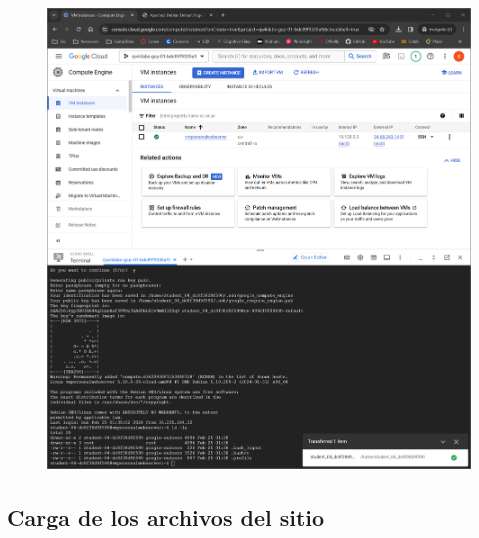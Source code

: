 \documentclass[12pt,a4paper]{article}
\begin{document}
\begin{figure}[H]
    \centering
    \includegraphics[width=1\linewidth]{M4_Servicios_Cómputo_en_la_Nube/Tarea_5_Creación_Máquinas_Virtuales_en_Nube/reporte/figuras/2_3_2_Configuración_Pública.png}
    \label{fig:Google_5}
\end{figure}

\subsection{Carga de los archivos del sitio}
\end{document}
